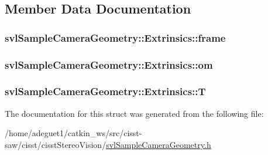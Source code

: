 \subsection{Member Data Documentation}
\hypertarget{structsvl_sample_camera_geometry_1_1_extrinsics_a9640da226d49f0f869ab02ab2636e760}{
\subsubsection[{frame}]{ svl\-Sample\-Camera\-Geometry\-::\-Extrinsics\-::frame}}\label{structsvl_sample_camera_geometry_1_1_extrinsics_a9640da226d49f0f869ab02ab2636e760}
\hypertarget{structsvl_sample_camera_geometry_1_1_extrinsics_abd8791bf9873b33112dba8c6fb055a62}{
\subsubsection[{om}]{ svl\-Sample\-Camera\-Geometry\-::\-Extrinsics\-::om}}\label{structsvl_sample_camera_geometry_1_1_extrinsics_abd8791bf9873b33112dba8c6fb055a62}
\hypertarget{structsvl_sample_camera_geometry_1_1_extrinsics_aeeb68b4523c0230563b17f03bc7f5ebe}{
\subsubsection[{T}]{ svl\-Sample\-Camera\-Geometry\-::\-Extrinsics\-::\-T}}\label{structsvl_sample_camera_geometry_1_1_extrinsics_aeeb68b4523c0230563b17f03bc7f5ebe}


The documentation for this struct was generated from the following file\-:\begin{DoxyCompactItemize}
\item 
/home/adeguet1/catkin\-\_\-ws/src/cisst-\/saw/cisst/cisst\-Stereo\-Vision/\hyperlink{svl_sample_camera_geometry_8h}{svl\-Sample\-Camera\-Geometry.\-h}\end{DoxyCompactItemize}

